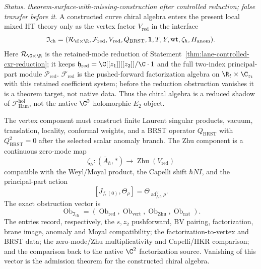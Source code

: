 \begin{stmt}\label{thm:lane-constructed-chiral-interface}
  \emph{Status.} \emph{theorem-surface-with-missing-construction after
  controlled reduction; false transfer before it}.  A constructed curve
  chiral algebra enters the present local mixed HT theory only as the
  vertex factor \(V_{\mathrm{red}}\) in the interface
  \[
    \mathfrak I_{\mathrm{ch}}
    =
    (\mathcal R_{\C\times\R},
     \mathcal F_{\mathrm{red}},
     V_{\mathrm{red}},
     Q_{\mathrm{BRST}},
     \mathbf 1,T,Y,\operatorname{wt},
     \zeta_\hbar,H_{\mathrm{anom}}).
  \]
  Here \(\mathcal R_{\C\times\R}\) is the retained-mode reduction of
  Statement~\ref{thm:lane-controlled-cxr-reduction}; it keeps
  \(\mathfrak h_{\mathrm{red}}=\C[[z_1]][[z_2]]/\C\cdot1\) and the full
  two-index principal-part module \(\mathcal P_{\mathrm{red}}\).
  \(\mathcal F_{\mathrm{red}}\) is the pushed-forward factorization
  algebra on \(\R_t\times\C_{z_1}\) with this retained coefficient
  system; before the reduction obstruction vanishes it is a theorem
  target, not native data.  Thus
  the chiral algebra is a reduced shadow of
  \(\mathcal F_{\mathrm{Ham}}^{\mathrm{hol}}\), not the native
  \(\C^2\) holomorphic \(E_2\) object.

  The vertex component must construct finite Laurent singular products,
  vacuum, translation, locality, conformal weights, and a BRST operator
  \(Q_{\mathrm{BRST}}\) with \(Q_{\mathrm{BRST}}^2=0\) after the selected
  scalar anomaly branch.  The Zhu component is a continuous zero-mode map
  \[
    \zeta_\hbar\colon(\bar A_\hbar,*)\longrightarrow
    \operatorname{Zhu}(V_{\mathrm{red}})
  \]
  compatible with the Weyl/Moyal product, the Capelli shift
  \(\hbar NI\), and the principal-part action
  \[
    [J_{f,(0)},\Theta_\rho]
    =
    \Theta_{\operatorname{ad}^{\vee}_{f,\hbar}\rho}.
  \]
  The exact obstruction vector is
  \[
    \operatorname{Ob}_{\mathfrak I_{\mathrm{ch}}}
    =
    (\operatorname{Ob}_{\mathrm{red}},
     \operatorname{Ob}_{\mathrm{vert}},
     \operatorname{Ob}_{\mathrm{Zhu}},
     \operatorname{Ob}_{\mathrm{nat}}).
  \]
  The entries record, respectively, the \(s,z_2\) pushforward, BV
  pairing, factorization, brane image, anomaly and Moyal compatibility;
  the factorization-to-vertex and BRST data; the zero-mode/Zhu
  multiplicativity and Capelli/HKR comparison; and the comparison back to
  the native \(\C^2\) factorization source.  Vanishing of this vector is
  the admission theorem for the constructed chiral algebra.
\end{stmt}

